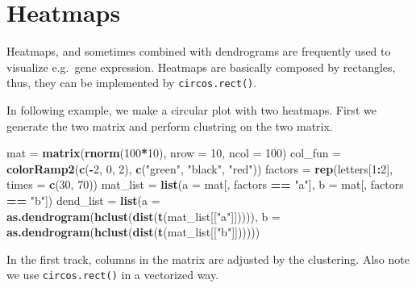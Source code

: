 \documentclass[]{book}
\newenvironment{Shaded}{\begin{snugshade}}{\end{snugshade}}
\newcommand{\KeywordTok}[1]{\textcolor[rgb]{0.13,0.29,0.53}{\textbf{#1}}}
\newcommand{\DataTypeTok}[1]{\textcolor[rgb]{0.13,0.29,0.53}{#1}}
\newcommand{\DecValTok}[1]{\textcolor[rgb]{0.00,0.00,0.81}{#1}}
\newcommand{\StringTok}[1]{\textcolor[rgb]{0.31,0.60,0.02}{#1}}
\newcommand{\OperatorTok}[1]{\textcolor[rgb]{0.81,0.36,0.00}{\textbf{#1}}}
\newcommand{\NormalTok}[1]{#1}
\begin{document}
\section{Heatmaps}\label{heatmaps}

Heatmaps, and sometimes combined with dendrograms are frequently used to
visualize e.g.~gene expression. Heatmaps are basically composed by
rectangles, thus, they can be implemented by \texttt{circos.rect()}.

In following example, we make a circular plot with two heatmaps. First
we generate the two matrix and perform clustring on the two matrix.

\begin{Shaded}
\begin{Highlighting}[]
\NormalTok{mat =}\StringTok{ }\KeywordTok{matrix}\NormalTok{(}\KeywordTok{rnorm}\NormalTok{(}\DecValTok{100}\OperatorTok{*}\DecValTok{10}\NormalTok{), }\DataTypeTok{nrow =} \DecValTok{10}\NormalTok{, }\DataTypeTok{ncol =} \DecValTok{100}\NormalTok{)}
\NormalTok{col_fun =}\StringTok{ }\KeywordTok{colorRamp2}\NormalTok{(}\KeywordTok{c}\NormalTok{(}\OperatorTok{-}\DecValTok{2}\NormalTok{, }\DecValTok{0}\NormalTok{, }\DecValTok{2}\NormalTok{), }\KeywordTok{c}\NormalTok{(}\StringTok{"green"}\NormalTok{, }\StringTok{"black"}\NormalTok{, }\StringTok{"red"}\NormalTok{))}
\NormalTok{factors =}\StringTok{ }\KeywordTok{rep}\NormalTok{(letters[}\DecValTok{1}\OperatorTok{:}\DecValTok{2}\NormalTok{], }\DataTypeTok{times =} \KeywordTok{c}\NormalTok{(}\DecValTok{30}\NormalTok{, }\DecValTok{70}\NormalTok{))}
\NormalTok{mat_list =}\StringTok{ }\KeywordTok{list}\NormalTok{(}\DataTypeTok{a =}\NormalTok{ mat[, factors }\OperatorTok{==}\StringTok{ "a"}\NormalTok{],}
                \DataTypeTok{b =}\NormalTok{ mat[, factors }\OperatorTok{==}\StringTok{ "b"}\NormalTok{])}
\NormalTok{dend_list =}\StringTok{ }\KeywordTok{list}\NormalTok{(}\DataTypeTok{a =} \KeywordTok{as.dendrogram}\NormalTok{(}\KeywordTok{hclust}\NormalTok{(}\KeywordTok{dist}\NormalTok{(}\KeywordTok{t}\NormalTok{(mat_list[[}\StringTok{"a"}\NormalTok{]])))),}
                 \DataTypeTok{b =} \KeywordTok{as.dendrogram}\NormalTok{(}\KeywordTok{hclust}\NormalTok{(}\KeywordTok{dist}\NormalTok{(}\KeywordTok{t}\NormalTok{(mat_list[[}\StringTok{"b"}\NormalTok{]])))))}
\end{Highlighting}
\end{Shaded}

In the first track, columns in the matrix are adjusted by the
clustering. Also note we use \texttt{circos.rect()} in a vectorized way.
\end{document}
